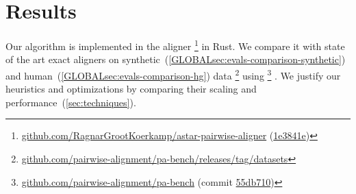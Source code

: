 \section{Results} \label{sec:evals}

Our algorithm is implemented in the aligner
\astarpa%
\footnote{\href{https://github.com/RagnarGrootKoerkamp/astar-pairwise-aligner}{github.com/RagnarGrootKoerkamp/astar-pairwise-aligner}
(\href{https://github.com/RagnarGrootKoerkamp/astar-pairwise-aligner/tree/1e3841e239093fc32ccc2eb3af1d2fe0da240b6e}{1e3841e})}
in Rust. We compare it with state of the art exact aligners on
synthetic~(\cref{GLOBALsec:evals-comparison-synthetic}) and
human~(\cref{GLOBALsec:evals-comparison-hg})
data%
\footnote{\href{https://github.com/pairwise-alignment/pa-bench/releases/tag/datasets}{github.com/pairwise-alignment/pa-bench/releases/tag/datasets}}
using \pabench%
\footnote{\href{https://github.com/pairwise-alignment/pa-bench}{github.com/pairwise-alignment/pa-bench}
(commit
\href{https://github.com/pairwise-alignment/pa-bench/commit/55db71002d6a0ef5623a231a8c19085e34712223}{55db710})}%
.
We justify our heuristics and optimizations by comparing their scaling and
performance~(\cref{sec:techniques}).







